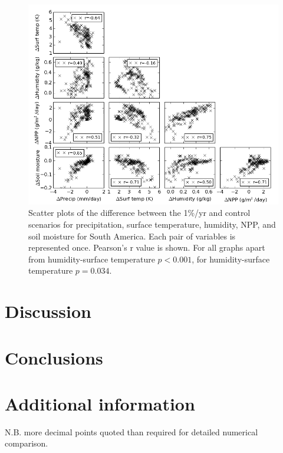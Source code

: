 \documentclass{article}
\begin{document}
\begin{figure}[hbp]
    \centering
    \includegraphics[width=\textwidth]{figures/corr}
    \caption{Scatter plots of the difference between the 1\%/yr and control scenarios for precipitation, surface temperature, humidity, NPP, and soil moisture for South America. Each pair of variables is represented once. Pearson's r value is shown. For all graphs apart from humidity-surface temperature $p < 0.001$, for humidity-surface temperature $p = 0.034$. }
    \label{fig:corr}
\end{figure}

\newpage

\section{Discussion}

\section{Conclusions}

\printbibliography
\appendix 

\section{Additional information}

N.B. more decimal points quoted than required for detailed numerical comparison.
\end{document}
